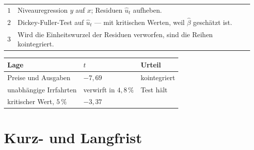 \begin{merksatz}
\begin{center}
{\small
\renewcommand{\arraystretch}{1.55}
\begin{tabular}{@{}P{1.0cm}P{7.4cm}@{}}
\toprule
$1$ & Niveauregression $y$ auf $x$; Residuen $\hat u_t$ aufheben.\\
$2$ & Dickey-Fuller-Test auf $\hat u_t$ --- mit  kritischen Werten, weil $\hat\beta$ geschätzt ist.\\
$3$ & Wird die Einheitswurzel der Residuen verworfen, sind die Reihen kointegriert.\\
\bottomrule
\end{tabular}}
\end{center}

\begin{center}
{\small
\renewcommand{\arraystretch}{1.48}
\begin{tabular}{@{}P{3.6cm}P{2.0cm}P{2.4cm}@{}}
\toprule
\textbf{Lage} & $t$ & \textbf{Urteil}\\
\midrule
Preise und Ausgaben & $-7{,}69$ & \textcolor{gruen}{kointegriert}\\
unabhängige Irrfahrten & verwirft in $4{,}8\,\%$ & \textcolor{gruen}{Test hält}\\
\midrule
kritischer Wert, $5\,\%$ & $-3{,}37$ & \\
\bottomrule
\end{tabular}}
\end{center}

\begin{center}
\begin{minipage}{0.88\textwidth}
\end{minipage}
\end{center}
\end{merksatz}

\section{Kurz- und Langfrist}

